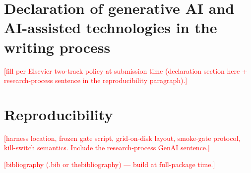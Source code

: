 \documentclass[preprint,12pt]{elsarticle}
\newcommand{\todoslot}[1]{\textcolor{red}{[#1]}}
\begin{document}
\section*{Declaration of generative AI and AI-assisted technologies in the writing process}
\todoslot{fill per Elsevier two-track policy at submission time (declaration section
here + research-process sentence in the reproducibility paragraph).}

\section*{Reproducibility}
\todoslot{harness location, frozen gate script, grid-on-disk layout, smoke-gate
protocol, kill-switch semantics. Include the research-process GenAI sentence.}


\todoslot{bibliography (.bib or thebibliography) — build at full-package time.}
\end{document}
